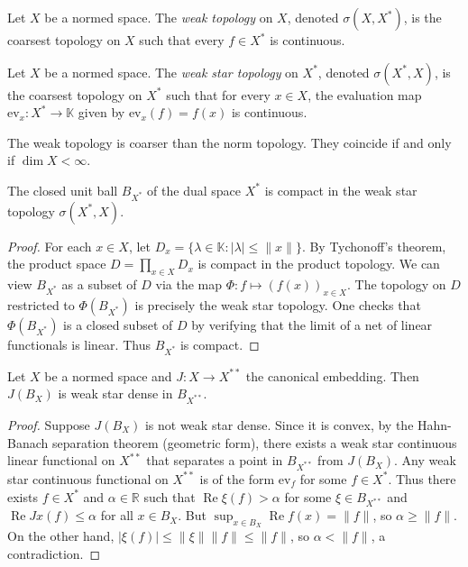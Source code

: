 \begin{definition}
\label{definition-weak-topology}
Let $X$ be a normed space. The {\it weak
topology} on $X$, denoted $\sigma(X,X^*)$, is
the coarsest topology on $X$ such that every
$f \in X^*$ is continuous.
\end{definition}

\begin{definition}
\label{definition-weak-star-topology}
Let $X$ be a normed space. The {\it weak star
topology} on $X^*$, denoted $\sigma(X^*,X)$,
is the coarsest topology on $X^*$ such that
for every $x \in X$, the evaluation map
$\text{ev}_x : X^* \to \mathbb{K}$ given by
$\text{ev}_x(f) = f(x)$ is continuous.
\end{definition}

\begin{proposition}
\label{proposition-weak-vs-norm-topology}
The weak topology is coarser than the norm
topology. They coincide if and only if $\dim
X < \infty$.
\end{proposition}

\begin{theorem}
\label{theorem-banach-alaoglu}
The closed unit ball $B_{X^*}$ of the dual
space $X^*$ is compact in the weak star
topology $\sigma(X^*,X)$.
\end{theorem}

\begin{proof}
For each $x \in X$, let $D_x = \{ \lambda \in
\mathbb{K} : |\lambda| \leq \|x\| \}$. By
Tychonoff's theorem, the product space $D =
\prod_{x \in X} D_x$ is compact in the
product topology. We can view $B_{X^*}$ as a
subset of $D$ via the map $\Phi : f \mapsto
(f(x))_{x \in X}$. The topology on $D$
restricted to $\Phi(B_{X^*})$ is precisely
the weak star topology. One checks that
$\Phi(B_{X^*})$ is a closed subset of $D$ by
verifying that the limit of a net of linear
functionals is linear. Thus $B_{X^*}$ is
compact.
\end{proof}

\begin{theorem}[Goldstine]
\label{theorem-goldstine}
Let $X$ be a normed space and $J : X \to
X^{**}$ the canonical embedding. Then
$J(B_X)$ is weak star dense in $B_{X^{**}}$.
\end{theorem}

\begin{proof}
Suppose $J(B_X)$ is not weak star dense.
Since it is convex, by the Hahn-Banach
separation theorem (geometric form), there
exists a weak star continuous linear
functional on $X^{**}$ that separates a point
in $B_{X^{**}}$ from $J(B_X)$. Any weak star
continuous functional on $X^{**}$ is of the
form $\text{ev}_f$ for some $f \in X^*$. Thus
there exists $f \in X^*$ and $\alpha \in
\mathbb{R}$ such that $\operatorname{Re}
\xi(f) > \alpha$ for some $\xi \in
B_{X^{**}}$ and $\operatorname{Re} Jx(f) \leq
\alpha$ for all $x \in B_X$. But $\sup_{x \in
B_X} \operatorname{Re} f(x) = \|f\|$, so
$\alpha \geq \|f\|$. On the other hand,
$|\xi(f)| \leq \|\xi\| \|f\| \leq \|f\|$, so
$\alpha < \|f\|$, a contradiction.
\end{proof}


